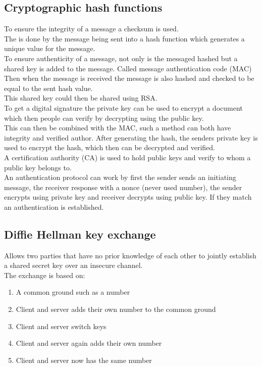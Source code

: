 \documentclass[12pt, a4paper]{article}
\begin{document}
		\subsection{Cryptographic hash functions}
			To ensure the integrity of a message a checksum is used.\\
			The is done by the message being sent into a hash function which generates a unique value for the message.\\
			To ensure authenticity of a message, not only is the messaged hashed but a shared key is added to the message. Called message authentication code (MAC)\\
			Then when the message is received the message is also hashed and checked to be equal to the sent hash value.\\
			This shared key could then be shared using RSA.\\[4mm]
			To get a digital signature the private key can be used to encrypt a document which then people can verify by decrypting using the public key.\\
			This can then be combined with the MAC, such a method can both have integrity and verified author. After generating the hash, the senders private key is used to encrypt the hash, which then can be decrypted and verified.\\
			A certification authority (CA) is used to hold public keys and verify to whom a public key belongs to.\\
			An authentication protocol can work by first the sender sends an initiating message, the receiver response with a nonce (never used number), the sender encrypts using private key and receiver decrypts using public key. If they match an authentication is established.\\
		
		\subsection{Diffie Hellman key exchange}
			Allows two parties that have no prior knowledge of each other to jointly establish a shared secret key over an insecure channel.\\
			The exchange is based on:
			\begin{enumerate}
				\item A common ground such as a number
				\item Client and server adds their own number to the common ground
				\item Client and server switch keys
				\item Client and server again adds their own number
				\item Client and server now has the same number
			\end{enumerate}
\end{document}
